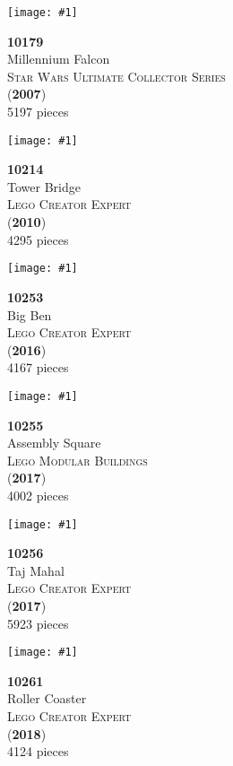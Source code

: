 \documentclass[letterpaper]{article}%
\newenvironment{legocell}[1]
{
	\begin{minipage}[c][2.0in][c]{4in}
	\centering
	\varwidth{3.6in}
	\raggedright %
	\begin{minipage}[c]{1.3in}
		\texttt{[image: \#1]}
	\end{minipage}
	\begin{minipage}[c]{2.2in}
	\raggedright
}
{
	\end{minipage}
	\endvarwidth
	\end{minipage}
	\allowbreak
	\ignorespaces
}
\begin{document}
\Large
\begin{legocell}{images/set_10179-1.jpg}
\textbf{10179}\\
{\sffamily\large Millennium Falcon}\\
\textsc{\color{DarkBlue}\normalsize Star Wars Ultimate Collector Series}\\
(\textbf{2007})\\
{\normalsize 5197 pieces}\\
\end{legocell}
\begin{legocell}{images/set_10214-1.jpg}
\textbf{10214}\\
{\sffamily\large Tower Bridge}\\
\textsc{\color{DarkBlue}\normalsize Lego Creator Expert}\\
(\textbf{2010})\\
{\normalsize 4295 pieces}\\
\end{legocell}
\begin{legocell}{images/set_10253-1.jpg}
\textbf{10253}\\
{\sffamily\large Big Ben}\\
\textsc{\color{DarkBlue}\normalsize Lego Creator Expert}\\
(\textbf{2016})\\
{\normalsize 4167 pieces}\\
\end{legocell}
\begin{legocell}{images/set_10255-1.jpg}
\textbf{10255}\\
{\sffamily\large Assembly Square}\\
\textsc{\color{DarkBlue}\normalsize Lego Modular Buildings}\\
(\textbf{2017})\\
{\normalsize 4002 pieces}\\
\end{legocell}
\begin{legocell}{images/set_10256-1.jpg}
\textbf{10256}\\
{\sffamily\large Taj Mahal}\\
\textsc{\color{DarkBlue}\normalsize Lego Creator Expert}\\
(\textbf{2017})\\
{\normalsize 5923 pieces}\\
\end{legocell}
\begin{legocell}{images/set_10261-1.jpg}
\textbf{10261}\\
{\sffamily\large Roller Coaster}\\
\textsc{\color{DarkBlue}\normalsize Lego Creator Expert}\\
(\textbf{2018})\\
{\normalsize 4124 pieces}\\
\end{legocell}
\end{document}
